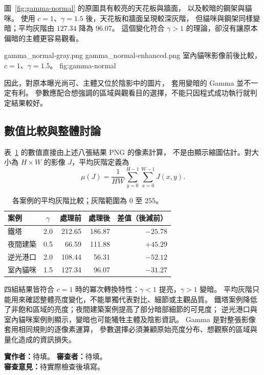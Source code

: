 圖~\ref{fig:gamma-normal} 的原圖具有較亮的天花板與牆面，
以及較暗的鋼架與貓咪。
使用 $c=1$、$\gamma=1.5$ 後，天花板和牆面呈現較深灰階，
但貓咪與鋼架同樣變暗；平均灰階由 $127.34$ 降為 $96.07$。
這個變化符合 $\gamma>1$ 的理論，卻沒有讓原本偏暗的主體更容易觀看。

\GammaComparison
  {gamma_normal-gray.png}
  {gamma_normal-enhanced.png}
  {室內貓咪影像前後比較，$c=1$、$\gamma=1.5$。}
  {fig:gamma-normal}

因此，對原本曝光尚可、主體又位於陰影中的圖片，
套用變暗的 Gamma 並不一定有利。
參數應配合想強調的區域與觀看目的選擇，不能只因程式成功執行就判定結果較好。

\subsection{數值比較與整體討論}

表~\ref{tab:gamma-means} 的數值直接由上述八張結果 PNG 的像素計算，
不是由顯示縮圖估計。對大小為 $H\times W$ 的影像 $J$，平均灰階定義為
\begin{equation}
  \mu(J)=\frac{1}{HW}\sum_{y=0}^{H-1}\sum_{x=0}^{W-1}J(x,y).
\end{equation}

\begin{table}[H]
  \centering
  \caption{各案例的平均灰階比較；灰階範圍為 $0$ 至 $255$。}
  \label{tab:gamma-means}
  \begin{tabular}{@{}lcrrr@{}}
    \toprule
    案例 & $\gamma$ & 處理前 & 處理後 & 差值（後減前） \\
    \midrule
    鐵塔 & 2.0 & 212.65 & 186.87 & $-25.78$ \\
    夜間建築 & 0.5 & 66.59 & 111.88 & $+45.29$ \\
    逆光港口 & 2.0 & 108.44 & 56.31 & $-52.12$ \\
    室內貓咪 & 1.5 & 127.34 & 96.07 & $-31.27$ \\
    \bottomrule
  \end{tabular}
\end{table}

四組結果皆符合 $c=1$ 時的冪次轉換特性：$\gamma<1$ 提亮，$\gamma>1$ 變暗。
平均灰階只能用來確認整體亮度變化，不能單獨代表對比、細節或主觀品質。
鐵塔案例降低了非飽和區域的亮度；夜間建築案例提高了部分暗部細節的可見度；
逆光港口與室內貓咪案例則顯示，變暗也可能犧牲主體及陰影資訊。
Gamma 是對整張影像套用相同規則的逐像素運算，
參數選擇必須兼顧原始亮度分布、想觀察的區域與量化造成的資訊損失。

\medskip
\noindent\textbf{實作者：}待填。\quad
\textbf{審查者：}待填。\\
\textbf{審查意見：}待實際檢查後填寫。

